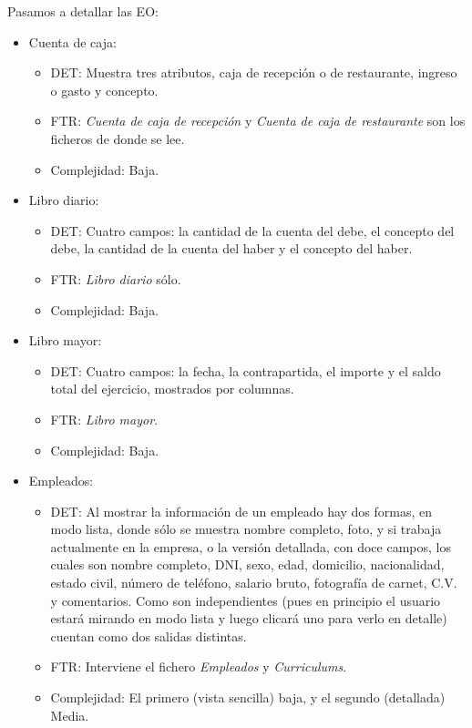 \documentclass[spanish,a4paper,11pt, twoside]{report}	%
\begin{document}
	Pasamos a detallar las EO:
	\begin{itemize}
		\item{Cuenta de caja:} 
		\begin{itemize}
 			\item{DET:} Muestra tres atributos, caja de recepción o de restaurante, ingreso o gasto y concepto.
			\item{FTR:} \textit{Cuenta de caja de recepción} y \textit{Cuenta de caja de restaurante} son los ficheros de donde se lee.
			\item{Complejidad:} Baja.
		\end{itemize}
		\item{Libro diario:} 
		\begin{itemize}
 			\item{DET:} Cuatro campos: la cantidad de la cuenta del debe, el concepto del debe, la cantidad de la cuenta del haber y el concepto del haber.
			\item{FTR:} \textit{Libro diario} sólo.
			\item{Complejidad:} Baja.
		\end{itemize}
		\item{Libro mayor:} 
		\begin{itemize}
 			\item{DET:} Cuatro campos: la fecha, la contrapartida, el importe y el saldo total del ejercicio, mostrados por columnas.
			\item{FTR:} \textit{Libro mayor}.
			\item{Complejidad:} Baja.
		\end{itemize}
		\item{Empleados:} 
		\begin{itemize}
 			\item{DET:} Al mostrar la información de un empleado hay dos formas, en modo lista, donde sólo se muestra nombre completo, foto, y si trabaja actualmente en la empresa, o la versión detallada, con doce campos, los cuales son nombre completo, DNI, sexo, edad, domicilio, nacionalidad, estado civil, número de teléfono, salario bruto, fotografía de carnet, C.V. y comentarios. Como son independientes (pues en principio el usuario estará mirando en modo lista y luego clicará uno para verlo en detalle) cuentan como dos salidas distintas.
			\item{FTR:} Interviene el fichero \textit{Empleados} y \textit{Curriculums}.
			\item{Complejidad:} El primero (vista sencilla) baja, y el segundo (detallada) Media.

\end{itemize}
\end{itemize}
\end{document}
